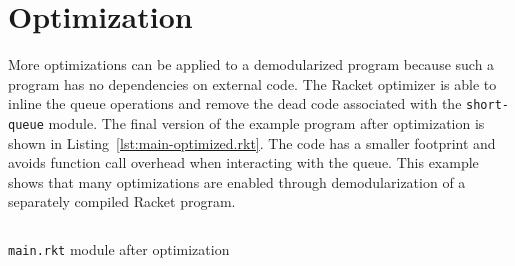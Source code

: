 \section{Optimization}

More optimizations can be applied to a demodularized program because such a program has no dependencies on external code.
The Racket optimizer is able to inline the queue operations and remove the dead code associated with the \texttt{short-queue} module. 
The final version of the example program after optimization is shown in Listing~\ref{lst:main-optimized.rkt}. 
The code has a smaller footprint and avoids function call overhead when interacting with the queue.
This example shows that many optimizations are enabled through demodularization of a separately compiled Racket program.

\begin{listing}
  \inputminted{racket}{listings/main-optimized.rkt}
  \caption{\texttt{main.rkt} module after optimization}
  \label{lst:main-optimized.rkt}
\end{listing}

